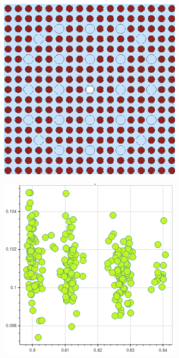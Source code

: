 \clearpage

\begin{figure}[h!]
\centering
\begin{subfigure}{0.45\textwidth}
  \centering
  \includegraphics[width=0.9\linewidth]{figures/unsupervised/features/assm-16/geometry}
  \caption{}
  \label{fig:chap10-capt-mean-std-geom}
\end{subfigure}%
\begin{subfigure}{0.45\textwidth}
  \centering
  \includegraphics[width=0.9\linewidth]{figures/unsupervised/features/assm-16/u238-capt/mean-std/mgxs}

\end{subfigure}
\end{figure}
